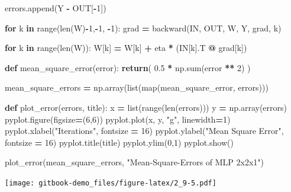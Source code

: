 \documentclass[
]{book}
\newenvironment{Shaded}{\begin{snugshade}}{\end{snugshade}}
\newcommand{\BuiltInTok}[1]{#1}
\newcommand{\ControlFlowTok}[1]{\textcolor[rgb]{0.13,0.29,0.53}{\textbf{#1}}}
\newcommand{\DecValTok}[1]{\textcolor[rgb]{0.00,0.00,0.81}{#1}}
\newcommand{\FloatTok}[1]{\textcolor[rgb]{0.00,0.00,0.81}{#1}}
\newcommand{\KeywordTok}[1]{\textcolor[rgb]{0.13,0.29,0.53}{\textbf{#1}}}
\newcommand{\NormalTok}[1]{#1}
\newcommand{\OperatorTok}[1]{\textcolor[rgb]{0.81,0.36,0.00}{\textbf{#1}}}
\newcommand{\StringTok}[1]{\textcolor[rgb]{0.31,0.60,0.02}{#1}}
\begin{document}
\begin{Shaded}
\begin{Highlighting}[]
\NormalTok{  errors.append(Y }\OperatorTok{{-}}\NormalTok{ OUT[}\OperatorTok{{-}}\DecValTok{1}\NormalTok{])}
    
  \ControlFlowTok{for}\NormalTok{ k }\KeywordTok{in} \BuiltInTok{range}\NormalTok{(}\BuiltInTok{len}\NormalTok{(W)}\OperatorTok{{-}}\DecValTok{1}\NormalTok{,}\OperatorTok{{-}}\DecValTok{1}\NormalTok{, }\OperatorTok{{-}}\DecValTok{1}\NormalTok{):}
\NormalTok{    grad }\OperatorTok{=}\NormalTok{ backward(IN, OUT, W, Y, grad, k) }
    
  \ControlFlowTok{for}\NormalTok{ k }\KeywordTok{in} \BuiltInTok{range}\NormalTok{(}\BuiltInTok{len}\NormalTok{(W)):}
\NormalTok{    W[k] }\OperatorTok{=}\NormalTok{ W[k] }\OperatorTok{+}\NormalTok{ eta }\OperatorTok{*}\NormalTok{ (IN[k].T }\OperatorTok{@}\NormalTok{ grad[k])}



\KeywordTok{def}\NormalTok{ mean\_square\_error(error):}
  \ControlFlowTok{return}\NormalTok{( }\FloatTok{0.5} \OperatorTok{*}\NormalTok{ np.}\BuiltInTok{sum}\NormalTok{(error }\OperatorTok{**} \DecValTok{2}\NormalTok{) )}

\NormalTok{mean\_square\_errors }\OperatorTok{=}\NormalTok{ np.array(}\BuiltInTok{list}\NormalTok{(}\BuiltInTok{map}\NormalTok{(mean\_square\_error, errors)))}

\KeywordTok{def}\NormalTok{ plot\_error(errors, title):}
\NormalTok{  x }\OperatorTok{=} \BuiltInTok{list}\NormalTok{(}\BuiltInTok{range}\NormalTok{(}\BuiltInTok{len}\NormalTok{(errors)))}
\NormalTok{  y }\OperatorTok{=}\NormalTok{ np.array(errors)}
\NormalTok{  pyplot.figure(figsize}\OperatorTok{=}\NormalTok{(}\DecValTok{6}\NormalTok{,}\DecValTok{6}\NormalTok{))}
\NormalTok{  pyplot.plot(x, y, }\StringTok{"g"}\NormalTok{, linewidth}\OperatorTok{=}\DecValTok{1}\NormalTok{)}
\NormalTok{  pyplot.xlabel(}\StringTok{"Iterations"}\NormalTok{, fontsize }\OperatorTok{=} \DecValTok{16}\NormalTok{)}
\NormalTok{  pyplot.ylabel(}\StringTok{"Mean Square Error"}\NormalTok{, fontsize }\OperatorTok{=} \DecValTok{16}\NormalTok{)}
\NormalTok{  pyplot.title(title)}
\NormalTok{  pyplot.ylim(}\DecValTok{0}\NormalTok{,}\DecValTok{1}\NormalTok{)}
\NormalTok{  pyplot.show()}
  
\NormalTok{plot\_error(mean\_square\_errors, }\StringTok{"Mean{-}Square{-}Errors of MLP 2x2x1"}\NormalTok{)}
\end{Highlighting}
\end{Shaded}

\texttt{[image: gitbook-demo\_files/figure-latex/2\_9-5.pdf]}

  
\end{document}
